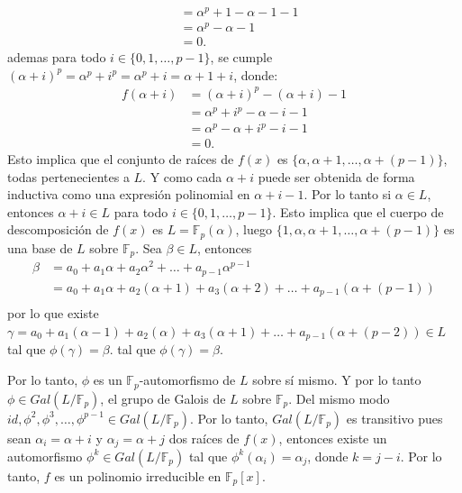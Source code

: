 \begin{solucion}
\begin{itemize}
\begin{align*}
        &= \alpha^p + 1 - \alpha - 1 - 1 \\
        &= \alpha^p - \alpha - 1 \\
        &= 0.
    \end{align*}
    ademas para todo $i \in \{0, 1, \ldots, p-1\}$, se cumple $(\alpha + i)^p = \alpha^p + i^p = \alpha^p + i = \alpha + 1 + i$, donde:
    \begin{align*}
        f(\alpha + i) &= (\alpha + i)^p - (\alpha + i) - 1 \\
        &= \alpha^p + i^p - \alpha - i - 1 \\
        &= \alpha^p - \alpha + i^p - i - 1 \\
        &= 0.
    \end{align*}
    Esto implica que el conjunto de raíces de $f(x)$ es $\{\alpha, \alpha + 1, \ldots, \alpha + (p-1)\}$, todas pertenecientes a $L$. Y como cada $\alpha + i$ puede ser obtenida de forma inductiva como una expresión polinomial en $\alpha + i - 1$. Por lo tanto si $\alpha \in L$, entonces $\alpha + i \in L$ para todo $i \in \{0, 1, \ldots, p-1\}$. Esto implica que el cuerpo de descomposición de $f(x)$ es $L = \mathbb{F}_p(\alpha)$, luego $\{1, \alpha, \alpha + 1, \ldots, \alpha + (p-1)\}$ es una base de $L$ sobre $\mathbb{F}_p$.  
    Sea $\beta \in L$, entonces 
    \begin{align*}
        \beta &= a_0 + a_1 \alpha + a_2 \alpha^2 + \ldots + a_{p-1} \alpha^{p-1}\\
        &= a_0 + a_1 \alpha + a_2 (\alpha + 1) + a_3 (\alpha + 2) + \ldots + a_{p-1} (\alpha + (p-1))\\
    \end{align*} por lo que existe $\gamma = a_0 + a_1 (\alpha -1) + a_2 (\alpha) + a_3 (\alpha + 1) + \ldots + a_{p-1} (\alpha + (p-2)) \in L$ tal que $\phi(\gamma) = \beta$.
    tal que $\phi(\gamma) = \beta$.
\end{itemize}
Por lo tanto, $\phi$ es un $\mathbb F_p$-automorfismo de $L$ sobre sí mismo. Y por lo tanto $\phi \in Gal(L/\mathbb{F}_p)$, el grupo de Galois de $L$ sobre $\mathbb{F}_p$. Del mismo modo $ id, \phi^2, \phi^3, \ldots, \phi^{p-1} \in Gal(L/\mathbb{F}_p)$. Por lo tanto, $Gal(L/\mathbb{F}_p)$ es transitivo pues sean $\alpha_i = \alpha + i$ y $\alpha_j = \alpha + j$ dos raíces de $f(x)$, entonces existe un automorfismo $\phi^k \in Gal(L/\mathbb{F}_p)$ tal que $\phi^k(\alpha_i) = \alpha_j$, donde $k = j - i$. Por lo tanto, $f$ es un polinomio irreducible en $\mathbb{F}_p[x]$.


 

\end{solucion}
